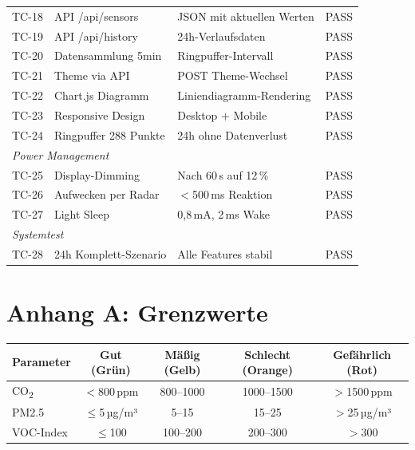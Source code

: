 \documentclass[a4paper,11pt]{article}
\begin{document}
\begin{longtable}{c p{5cm} p{5cm} c}
TC-18 & API /api/sensors & JSON mit aktuellen Werten & \textcolor{pass}{PASS} \\
TC-19 & API /api/history & 24h-Verlaufsdaten & \textcolor{pass}{PASS} \\
TC-20 & Datensammlung 5min & Ringpuffer-Intervall & \textcolor{pass}{PASS} \\
TC-21 & Theme via API & POST Theme-Wechsel & \textcolor{pass}{PASS} \\
TC-22 & Chart.js Diagramm & Liniendiagramm-Rendering & \textcolor{pass}{PASS} \\
TC-23 & Responsive Design & Desktop + Mobile & \textcolor{pass}{PASS} \\
TC-24 & Ringpuffer 288 Punkte & 24h ohne Datenverlust & \textcolor{pass}{PASS} \\
\midrule
\multicolumn{4}{l}{\textit{Power Management}} \\
\midrule
TC-25 & Display-Dimming & Nach 60\,s auf 12\,\% & \textcolor{pass}{PASS} \\
TC-26 & Aufwecken per Radar & $<$500\,ms Reaktion & \textcolor{pass}{PASS} \\
TC-27 & Light Sleep & 0,8\,mA, 2\,ms Wake & \textcolor{pass}{PASS} \\
\midrule
\multicolumn{4}{l}{\textit{Systemtest}} \\
\midrule
TC-28 & 24h Komplett-Szenario & Alle Features stabil & \textcolor{pass}{PASS} \\
\bottomrule
\end{longtable}

\section{Anhang A: Grenzwerte}

\begin{longtable}{l c c c c}
\toprule
\rowcolor{tableheader}
\textbf{Parameter} & \textbf{Gut (Grün)} & \textbf{Mäßig (Gelb)} & \textbf{Schlecht (Orange)} & \textbf{Gefährlich (Rot)} \\
\midrule
CO\textsubscript{2} & $<$800\,ppm & 800--1000 & 1000--1500 & $>$1500\,ppm \\
PM2.5 & $\leq$5\,µg/m³ & 5--15 & 15--25 & $>$25\,µg/m³ \\
VOC-Index & $\leq$100 & 100--200 & 200--300 & $>$300 \\
\bottomrule
\end{longtable}
\end{document}

